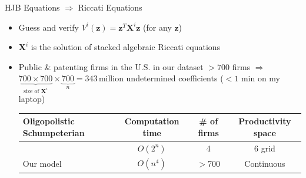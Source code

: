 \documentclass[
  10pt,
  aspectratio=169,   %
]{beamer}
\theoremstyle{plain}
\begin{document}
\begin{frame}{HJB Equations $\Longrightarrow$ Riccati Equations}

  \label{hjb}
  \begin{itemize}
    \item Guess and verify $V^{i}\left(\bm{z}\right)=\bm{z}^{T}\bm{X}^{i}\bm{z}$
          (for any $\bm{z}$) \medskip{}
    \item $\bm{X}^{i}$ is the solution of stacked algebraic Riccati equations

          \hyperlink{riccati}{}\medskip{}\pause
    \item Public \& patenting firms in the U.S. in our dataset $> 700$
          firms $\Longrightarrow$ \\
          $\underbrace{700\times700}_{\text{size of } \bm{X}^{i}} \times \underbrace{700}_{n}=343\,\text{million}$ undetermined coefficients ($< 1$ min on my laptop)\medskip{}
  \begin{center}
    \begin{tabular}{@{}p{5cm}ccc@{}}
      \toprule
      Oligopolistic Schumpeterian & Computation time & \# of firms   & Productivity space \\
      \midrule
      \citet{Cavenaile2023-lo}    & $O(2^n)$         & 4             & 6 grid             \\
      Our model                   & $O(n^4)$         & $>$700 & Continuous         \\
      \bottomrule
    \end{tabular}
  \end{center}
  \hyperlink{negative_rd_and_output}{}
\end{itemize}
\end{frame}
\end{document}
